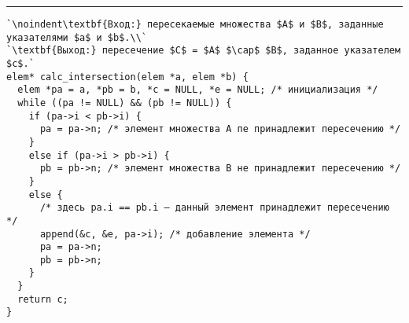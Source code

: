 \documentclass{article}
\begin{document}
\vspace{5pt} \hrule
\begin{lstlisting}[caption={Вычисление пересечения слиянием}, label=p44_merge_intersection_calculation, escapechar=`]
`\noindent\textbf{Вход:} пересекаемые множества $A$ и $B$, заданные указателями $a$ и $b$.\\`
`\textbf{Выход:} пересечение $C$ = $A$ $\cap$ $B$, заданное указателем $c$.`
elem* calc_intersection(elem *a, elem *b) {
  elem *pa = a, *pb = b, *c = NULL, *e = NULL; /* инициализация */
  while ((pa != NULL) && (pb != NULL)) {
    if (pa->i < pb->i) {
      pa = pa->n; /* элемент множества A пе принадлежит пересечению */
    }
    else if (pa->i > pb->i) {
      pb = pb->n; /* элемент множества B не принадлежит пересечению */
    }
    else {
      /* здесь pa.i == pb.i — данный элемент принадлежит пересечению */
      append(&c, &e, pa->i); /* добавление элемента */
      pa = pa->n;
      pb = pb->n;
    }
  }
  return c;
}
\end{lstlisting}
\end{document}
